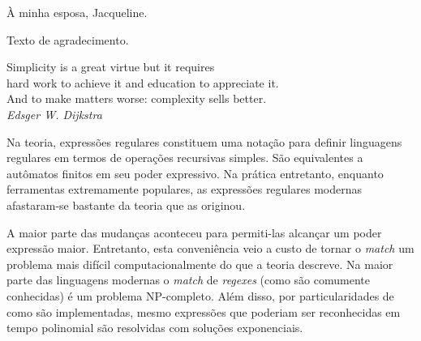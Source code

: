 \documentclass[a4paper,12pt,oneside,onecolumn]{uerj}
\begin{document}
\frontmatter
\capa
\folhaderosto

%

\begin{folhadeaprovacao}
\end{folhadeaprovacao}


  \vfill\vfill
    \hfill À minha esposa, Jacqueline.
  \vfill



Texto de agradecimento.


\pretextualchapter{}

  \vfill\vfill\vfill\vfill
  \begin{flushright}
    Simplicity is a great virtue but it requires\\
    hard work to achieve it and education to appreciate it.\\
    And to make matters worse: complexity sells better.\\
    \textsl{Edsger W. Dijkstra}
  \end{flushright}
  \vfill




Na teoria, expressões regulares constituem uma notação para definir linguagens regulares em termos de operações recursivas simples. São equivalentes a autômatos finitos em seu poder expressivo. Na prática entretanto, enquanto ferramentas extremamente populares, as expressões regulares modernas afastaram-se bastante da teoria que as originou. 

A maior parte das mudanças aconteceu para permiti-las alcançar um poder expressão maior. Entretanto, esta conveniência veio a custo de tornar o \emph{match} um problema mais difícil computacionalmente do que a teoria descreve. Na maior parte das linguagens modernas o \emph{match} de \emph{regexes} (como são comumente conhecidas) é um problema NP-completo. Além disso, por particularidades de como são implementadas, mesmo expressões que poderiam ser reconhecidas em tempo polinomial são resolvidas com soluções exponenciais. 
\end{document}
